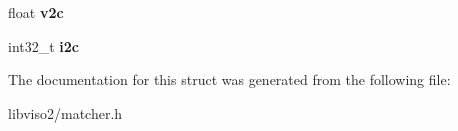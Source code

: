 \begin{DoxyCompactItemize}
\item 
\hypertarget{struct_matcher_1_1p__match_a426fbea6aa71d2d1a96ef10a3cec8b73}{float {\bfseries v2c}}\label{struct_matcher_1_1p__match_a426fbea6aa71d2d1a96ef10a3cec8b73}

\item 
\hypertarget{struct_matcher_1_1p__match_afabf9c5c9f72b2d89112bf82304c7be6}{int32\+\_\+t {\bfseries i2c}}\label{struct_matcher_1_1p__match_afabf9c5c9f72b2d89112bf82304c7be6}

\end{DoxyCompactItemize}


The documentation for this struct was generated from the following file\+:\begin{DoxyCompactItemize}
\item 
libviso2/matcher.\+h\end{DoxyCompactItemize}
